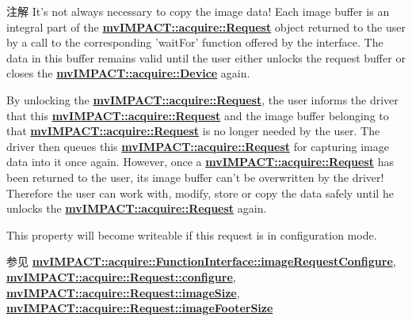 \begin{DoxyNote}{注解}
It's not always necessary to copy the image data! Each image buffer is an integral part of the {\bfseries \hyperlink{classmv_i_m_p_a_c_t_1_1acquire_1_1_request}{mv\+I\+M\+P\+A\+C\+T\+::acquire\+::\+Request}} object returned to the user by a call to the corresponding 'wait\+For' function offered by the interface. The data in this buffer remains valid until the user either unlocks the request buffer or closes the {\bfseries \hyperlink{classmv_i_m_p_a_c_t_1_1acquire_1_1_device}{mv\+I\+M\+P\+A\+C\+T\+::acquire\+::\+Device}} again.

By unlocking the {\bfseries \hyperlink{classmv_i_m_p_a_c_t_1_1acquire_1_1_request}{mv\+I\+M\+P\+A\+C\+T\+::acquire\+::\+Request}}, the user informs the driver that this {\bfseries \hyperlink{classmv_i_m_p_a_c_t_1_1acquire_1_1_request}{mv\+I\+M\+P\+A\+C\+T\+::acquire\+::\+Request}} and the image buffer belonging to that {\bfseries \hyperlink{classmv_i_m_p_a_c_t_1_1acquire_1_1_request}{mv\+I\+M\+P\+A\+C\+T\+::acquire\+::\+Request}} is no longer needed by the user. The driver then queues this {\bfseries \hyperlink{classmv_i_m_p_a_c_t_1_1acquire_1_1_request}{mv\+I\+M\+P\+A\+C\+T\+::acquire\+::\+Request}} for capturing image data into it once again. However, once a {\bfseries \hyperlink{classmv_i_m_p_a_c_t_1_1acquire_1_1_request}{mv\+I\+M\+P\+A\+C\+T\+::acquire\+::\+Request}} has been returned to the user, its image buffer can't be overwritten by the driver! Therefore the user can work with, modify, store or copy the data safely until he unlocks the {\bfseries \hyperlink{classmv_i_m_p_a_c_t_1_1acquire_1_1_request}{mv\+I\+M\+P\+A\+C\+T\+::acquire\+::\+Request}} again.

This property will become writeable if this request is in configuration mode. 
\end{DoxyNote}
\begin{DoxySeeAlso}{参见}
{\bfseries \hyperlink{classmv_i_m_p_a_c_t_1_1acquire_1_1_function_interface_a05594ac5b54679152d27ac0e73b3908e}{mv\+I\+M\+P\+A\+C\+T\+::acquire\+::\+Function\+Interface\+::image\+Request\+Configure}}, ~\newline
 {\bfseries \hyperlink{classmv_i_m_p_a_c_t_1_1acquire_1_1_request_a5ad02aed16acd60699f3d8757c63af43}{mv\+I\+M\+P\+A\+C\+T\+::acquire\+::\+Request\+::configure}}, ~\newline
 {\bfseries \hyperlink{classmv_i_m_p_a_c_t_1_1acquire_1_1_request_ac568c457aa474e73066bcc369a26cca1}{mv\+I\+M\+P\+A\+C\+T\+::acquire\+::\+Request\+::image\+Size}}, ~\newline
 {\bfseries \hyperlink{classmv_i_m_p_a_c_t_1_1acquire_1_1_request_a6d8df3daf87f05fefbad25b7591a2459}{mv\+I\+M\+P\+A\+C\+T\+::acquire\+::\+Request\+::image\+Footer\+Size}} 
\end{DoxySeeAlso}
